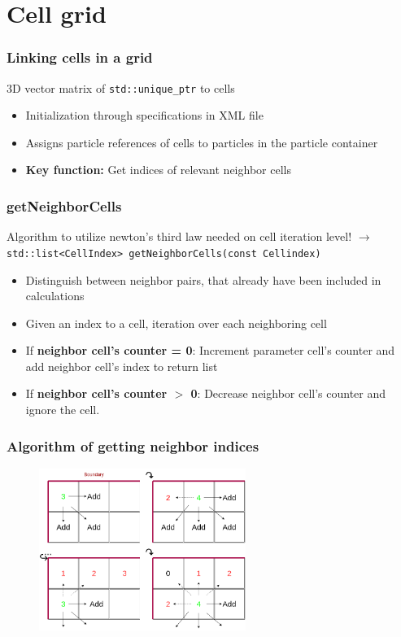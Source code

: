 
\section{Cell grid}
\label{sec:grid}

\begin{frame}
    \frametitle{Linking cells in a grid}
    3D vector matrix of \texttt{std::unique\_ptr} to cells
    \begin{itemize}
        \item Initialization through specifications in XML file
        \item Assigns particle references of cells to particles in the particle container
        \item \textbf{Key function:} Get indices of relevant neighbor cells
    \end{itemize}
\end{frame}

\begin{frame}
    \frametitle{getNeighborCells}
    Algorithm to utilize newton's third law needed on cell iteration level!\newline
    $\longrightarrow$ \texttt{std::list<CellIndex> getNeighborCells(const Cellindex)}
    \begin{itemize}
        \item Distinguish between neighbor pairs, that already have been included in calculations
        \item Given an index to a cell, iteration over each neighboring cell
        \item If \textbf{neighbor cell's counter = 0}: Increment parameter cell's counter and add neighbor cell's index to return list
        \item If \textbf{neighbor cell's counter $>$ 0}: Decrease neighbor cell's counter and ignore the cell.
    \end{itemize}
\end{frame}

\begin{frame}
    \frametitle{Algorithm of getting neighbor indices}
    \begin{figure}
        \label{fig:neighbor}
        \includegraphics[width=0.6\textwidth]{res/getNeighbor.drawio}
    \end{figure}
\end{frame}

